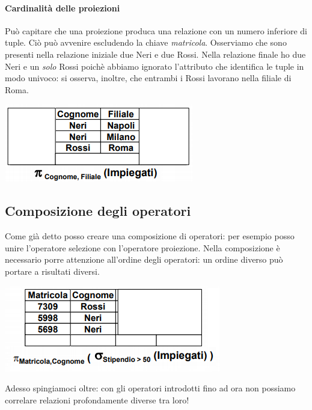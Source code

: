 \paragraph{Cardinalità delle proiezioni} Può capitare che una proiezione produca una relazione con un numero inferiore di tuple. Ciò può avvenire escludendo la chiave \emph{matricola}. Osserviamo che sono presenti nella relazione iniziale due Neri e due Rossi. Nella relazione finale ho due Neri e un \emph{solo} Rossi poichè abbiamo ignorato l'attributo che identifica le tuple in modo univoco: si osserva, inoltre, che entrambi i Rossi lavorano nella filiale di Roma.

\begin{center}
	\includegraphics{images/34.PNG}
\end{center}

\subsection{Composizione degli operatori}
Come già detto posso creare una composizione di operatori: per esempio posso unire l'operatore selezione con l'operatore proiezione. Nella composizione è necessario porre attenzione all'ordine degli operatori: un ordine diverso può portare a risultati diversi.

\begin{center}
	\includegraphics{images/35.PNG}
\end{center}
Adesso spingiamoci oltre: con gli operatori introdotti fino ad ora non possiamo correlare relazioni profondamente diverse tra loro!
